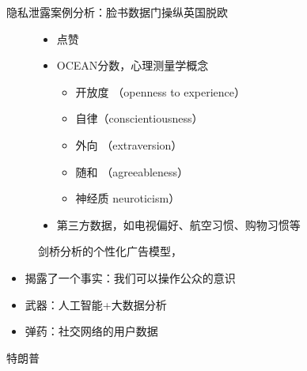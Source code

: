 \documentclass[11pt]{beamer}
\begin{document}
\begin{frame}[allowframebreaks]{隐私泄露案例分析：脸书数据门操纵英国脱欧}
\newpage
	\begin{minipage}[t]{0.6\linewidth}
		\begin{figure}
			\begin{itemize}
				\item 点赞
				\item OCEAN分数，心理测量学概念
				\begin{itemize}
					\item 开放度 （openness to experience）
					\item 自律（conscientiousness）
					\item 外向 （extraversion）
					\item 随和 （agreeableness）
					\item 神经质 neuroticism）
				\end{itemize}
				\item 第三方数据，如电视偏好、航空习惯、购物习惯等
			\end{itemize}
			\caption{剑桥分析的个性化广告模型， }
		\end{figure}
	\end{minipage}%
	\begin{minipage}[t]{0.4\linewidth}
		\begin{itemize}
			\item 揭露了一个事实：我们可以操作公众的意识
			
			\item 武器：人工智能+大数据分析
			
			\item 弹药：社交网络的用户数据
		\end{itemize}
	\end{minipage}%


\newpage

	\newpage
	特朗普
	

\end{frame}
\end{document}
